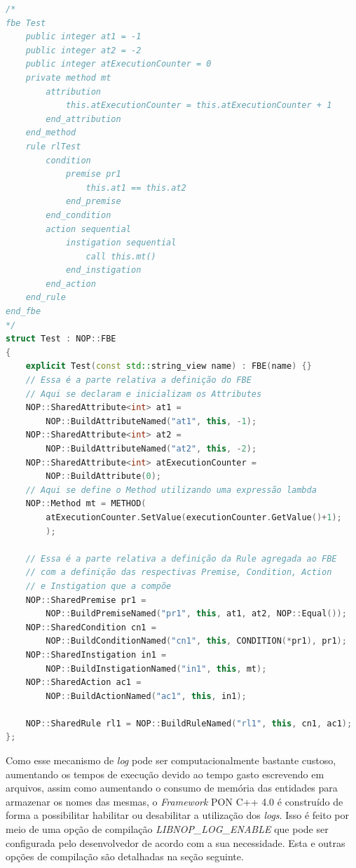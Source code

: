 \begin{lstlisting}[language=C++, float=htb,
    caption = {Exemplo de
    \textit{FBE} com nomes do \textit{Framework} PON C++ 4.0},
    source = {Autoria própria},
    label = {cod:debug_test}]
/*
fbe Test
    public integer at1 = -1
    public integer at2 = -2
    public integer atExecutionCounter = 0
    private method mt
        attribution
            this.atExecutionCounter = this.atExecutionCounter + 1
        end_attribution
    end_method
    rule rlTest
        condition
            premise pr1
                this.at1 == this.at2
            end_premise
        end_condition
        action sequential
            instigation sequential
                call this.mt()
            end_instigation
        end_action
    end_rule
end_fbe
*/
struct Test : NOP::FBE
{
    explicit Test(const std::string_view name) : FBE(name) {}
    // Essa é a parte relativa a definição do FBE
    // Aqui se declaram e inicializam os Attributes
    NOP::SharedAttribute<int> at1 =
        NOP::BuildAttributeNamed("at1", this, -1);
    NOP::SharedAttribute<int> at2 =
        NOP::BuildAttributeNamed("at2", this, -2);
    NOP::SharedAttribute<int> atExecutionCounter =
        NOP::BuildAttribute(0);
    // Aqui se define o Method utilizando uma expressão lambda
    NOP::Method mt = METHOD( 
        atExecutionCounter.SetValue(executionCounter.GetValue()+1);
        );

    // Essa é a parte relativa a definição da Rule agregada ao FBE
    // com a definição das respectivas Premise, Condition, Action
    // e Instigation que a compõe
    NOP::SharedPremise pr1 =
        NOP::BuildPremiseNamed("pr1", this, at1, at2, NOP::Equal());
    NOP::SharedCondition cn1 =
        NOP::BuildConditionNamed("cn1", this, CONDITION(*pr1), pr1);        
    NOP::SharedInstigation in1 =
        NOP::BuildInstigationNamed("in1", this, mt);
    NOP::SharedAction ac1 = 
        NOP::BuildActionNamed("ac1", this, in1);

    NOP::SharedRule rl1 = NOP::BuildRuleNamed("rl1", this, cn1, ac1);
};
\end{lstlisting}

\FloatBarrier

Como esse mecanismo de \textit{log} pode ser computacionalmente bastante
custoso, aumentando os tempos de execução devido ao tempo gasto escrevendo em
arquivos, assim como aumentando o consumo de memória das entidades para
armazenar os nomes das mesmas, o \textit{Framework} PON C++ 4.0 é construído de
forma a possibilitar habilitar ou desabilitar a utilização dos \textit{logs}.
Isso é feito por meio de uma opção de compilação \textit{LIBNOP\_LOG\_ENABLE}
que pode ser configurada pelo desenvolvedor de acordo com a sua necessidade.
Esta e outras opções de compilação são detalhadas na seção seguinte.

